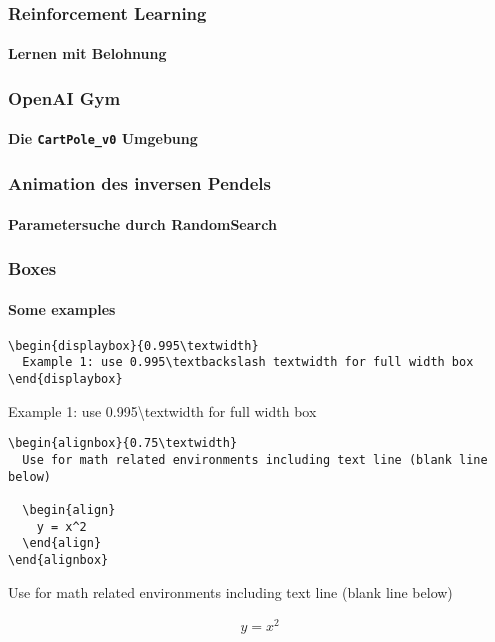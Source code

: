 \documentclass[10pt,t,aspectratio=1610]{beamer}
\begin{document}

\begin{frame}
	\frametitle{Reinforcement Learning}
	\framesubtitle{Lernen mit Belohnung}


\end{frame}


\begin{frame}
	\frametitle{OpenAI Gym}
	\framesubtitle{Die \texttt{CartPole\_v0} Umgebung}


\end{frame}


\begin{frame}
	\frametitle{Animation des inversen Pendels}
	\framesubtitle{Parametersuche durch RandomSearch}
	


\end{frame}


\begin{frame}[fragile]
  \frametitle{Boxes}
  \framesubtitle{Some examples}

\begin{verbatim}
\begin{displaybox}{0.995\textwidth}
  Example 1: use 0.995\textbackslash textwidth for full width box  
\end{displaybox}
\end{verbatim}
  
  \begin{displaybox}{0.995\textwidth}
    Example 1: use 0.995\textbackslash textwidth for full width box 
  \end{displaybox}
  
\begin{verbatim}
\begin{alignbox}{0.75\textwidth} 
  Use for math related environments including text line (blank line below)

  \begin{align}
    y = x^2
  \end{align}
\end{alignbox}
\end{verbatim}
  
  \begin{alignbox}{0.75\textwidth}
    Use for math related environments including text line (blank line below)
    
    \begin{align}
      y = x^2
    \end{align}
  \end{alignbox}
\end{frame}
\end{document}
